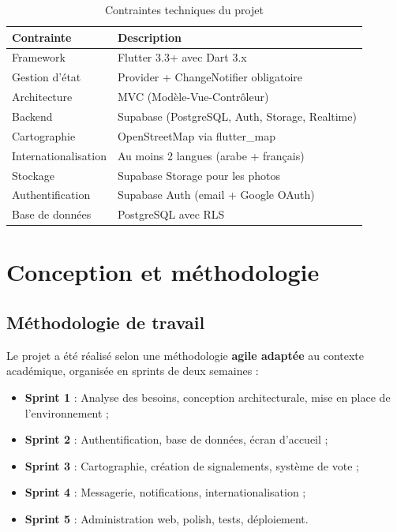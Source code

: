 \documentclass[12pt,a4paper]{report}
\begin{document}
{\small
\begin{longtable}{|p{3.5cm}|p{10.5cm}|}
    \caption{Contraintes techniques du projet}
    \label{tab:contraintes}\\
    \hline
    \rowcolor{supnumgreen!20}
    \textbf{Contrainte} & \textbf{Description} \\
    \hline
    \endhead
    \hline
    \endfoot
    Framework & Flutter 3.3+ avec Dart 3.x \\
    \hline
    Gestion d'état & Provider + ChangeNotifier obligatoire \\
    \hline
    Architecture & MVC (Modèle-Vue-Contrôleur) \\
    \hline
    Backend & Supabase (PostgreSQL, Auth, Storage, Realtime) \\
    \hline
    Cartographie & OpenStreetMap via flutter\_map \\
    \hline
    Internationalisation & Au moins 2 langues (arabe + français) \\
    \hline
    Stockage & Supabase Storage pour les photos \\
    \hline
    Authentification & Supabase Auth (email + Google OAuth) \\
    \hline
    Base de données & PostgreSQL avec RLS \\
    \hline
\end{longtable}
}

\chapter{Conception et méthodologie}

\section{Méthodologie de travail}

Le projet a été réalisé selon une méthodologie \textbf{agile adaptée} au contexte académique, organisée en sprints de deux semaines :

\begin{itemize}
    \item \textbf{Sprint 1} : Analyse des besoins, conception architecturale, mise en place de l'environnement ;
    \item \textbf{Sprint 2} : Authentification, base de données, écran d'accueil ;
    \item \textbf{Sprint 3} : Cartographie, création de signalements, système de vote ;
    \item \textbf{Sprint 4} : Messagerie, notifications, internationalisation ;
    \item \textbf{Sprint 5} : Administration web, polish, tests, déploiement.
\end{itemize}
\end{document}
